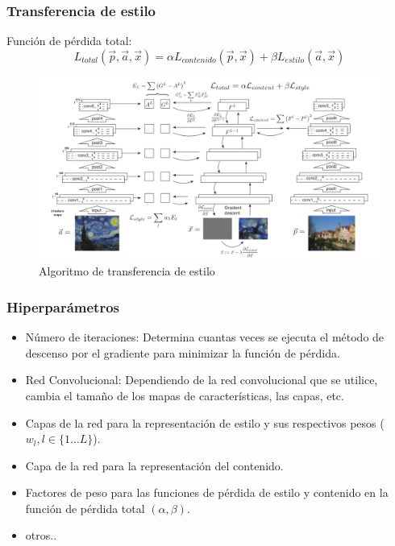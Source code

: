 \documentclass[12pt,center]{beamer}
\begin{document}
\begin{frame}
  \frametitle{Transferencia de estilo}
  Función de pérdida total: 
      \begin{equation}
	L_{total}(\overrightarrow{p},\overrightarrow{a},\overrightarrow{x}) = \alpha L_{contenido}(\overrightarrow{p},\overrightarrow{x}) + \beta L_{estilo}(\overrightarrow{a},\overrightarrow{x})
      \end{equation}
  \begin{figure}[h]
    \includegraphics[width=\textwidth]{./img/gatys_method.png}
    \caption{Algoritmo de transferencia de estilo}
  \end{figure}
\end{frame}

\begin{frame}
  \frametitle{Hiperparámetros}
  \begin{itemize}
   \item Número de iteraciones: Determina cuantas veces se ejecuta el método de descenso por el gradiente para minimizar la función de pérdida. 
   \item Red Convolucional: Dependiendo de la red convolucional que se utilice, cambia el tamaño de los mapas de características, las capas, etc.
   \item Capas de la red para la representación de estilo y sus respectivos pesos ($w_l, l \in \{1 \dots L\}$).
   \item Capa de la red para la representación del contenido.
   \item Factores de peso para las funciones de pérdida de estilo y contenido en la función de pérdida total $(\alpha, \beta)$.
   \item otros..
  \end{itemize}

\end{frame}
\end{document}

